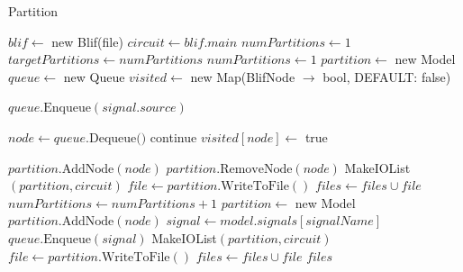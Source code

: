 \documentclass[12pt,final,oneside]{dwThesis} %
\begin{document}
   \begin{algorithm}
      \caption{Partition}\label{partition}

      \begin{algorithmic}[1]
         \State $blif \gets$
         new Blif(file)  
         \State $circuit \gets
         blif.main$ 
         \State $numPartitions \gets 1$
	\Repeat
		\State $targetPartitions \gets numPartitions$
		\State $numPartitions \gets 1$
	         \State
	         $partition \gets$ new Model  
	         \State $queue
	         \gets$ new Queue  
	         \State $visited \gets$ new
	         Map(BlifNode $\to$ bool, DEFAULT: false)
	
	         \State
	         $queue.\mbox{Enqueue}(signal.source)$ \EndFor
	
	         \State $node \gets queue.\mbox{Dequeue()}$
	         \State continue  \EndIf 
	         \State $visited[node] \gets $ true
	
	         \State $partition.\mbox{AddNode}(node)$
	         \State
	         $partition.\mbox{RemoveNode}(node)$ 
	         \State MakeIOList$(partition,
	         circuit)$ 
	         \State $file \gets partition.\mbox{WriteToFile}()$ 
	         \State
	         $files \gets files\cup file$ 
	         \State $numPartitions \gets
	         numPartitions+1$ 
	         \State $partition \gets$ new Model  
	         \State $partition.\mbox{AddNode}(node)$ \EndIf
	         \State $signal \gets
	         model.signals[signalName]$ 
	         \State $queue.\mbox{Enqueue}(signal)$
	         \EndFor
	         \EndWhile
	         \State
	         MakeIOList$(partition, circuit)$ 
	         \State $file \gets
	         partition.\mbox{WriteToFile}()$ 
	         \State $files \gets files\cup file$
	         \EndIf
         \Return $files$ \EndProcedure 
      \end{algorithmic}


   \end{algorithm}
\end{document}
